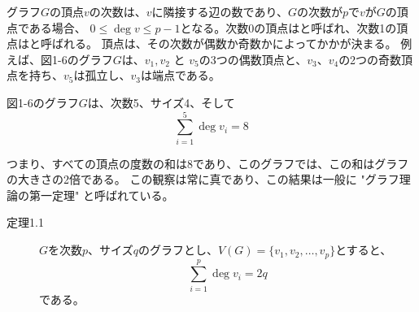 
グラフ$G$の頂点$v$の次数は、$v$に隣接する辺の数であり、$G$の次数が$p$で$v$が$G$の頂点である場合、
$0 \leq \deg v \leq p-1$となる。次数0の頂点は\textbf{}と呼ばれ、次数1の頂点は\textbf{}と呼ばれる。
頂点は、その次数が偶数か奇数かによって\textbf{}か\textbf{}かが決まる。
例えば、図1-6のグラフ$G$は、$v_1, v_2$ と $v_5$の3つの偶数頂点と、$v_3、v_4$の2つの奇数頂点を持ち、$v_5$は孤立し、$v_3$は端点である。

図1-6のグラフ$G$は、次数5、サイズ4、そして
$$\sum_{i = 1}^{5}  \deg v_i = 8$$

つまり、すべての頂点の度数の和は8であり、このグラフでは、この和はグラフの大きさの2倍である。
この観察は常に真であり、この結果は一般に "グラフ理論の第一定理" と呼ばれている。

\begin{description}
  \item[定理1.1] $G$を次数$p$、サイズ$q$のグラフとし、$V(G) = \{ v_1, v_2, \ldots, v_p \}$とすると、
  $$\sum_{i= 1}^{p}  \deg v_i = 2q $$である。
\end{description}